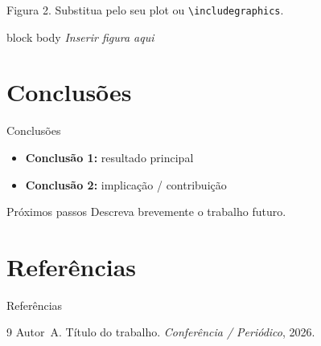 \documentclass[aspectratio=169, 11pt, brazil]{beamer}
\begin{document}
\begin{frame}[plain]
  \begin{figuraampla}{Figura 2. Substitua pelo seu plot ou \texttt{\textbackslash includegraphics}.}
    \begin{beamercolorbox}[wd=0.92\textwidth, rounded=true, sep=12pt, center]{block body}
      \vspace{1.8cm}
      {\small\textit{Inserir figura aqui}}
      \vspace{1.8cm}
    \end{beamercolorbox}
  \end{figuraampla}
\end{frame}

\section{Conclusões}

\begin{frame}{Conclusões}
  \begin{itemize}
    \item \textbf{Conclusão 1:} resultado principal
    \item \textbf{Conclusão 2:} implicação / contribuição
  \end{itemize}

  \vspace{1em}
  \begin{alerta}{Próximos passos}
    Descreva brevemente o trabalho futuro.
  \end{alerta}
\end{frame}

\section*{Referências}
\begin{frame}[allowframebreaks]{Referências}
  \begin{thebibliography}{9}
      Autor~A.
      \newblock Título do trabalho.
      \newblock \emph{Conferência / Periódico}, 2026.
  \end{thebibliography}
\end{frame}

\agradecimentos

\end{document}
